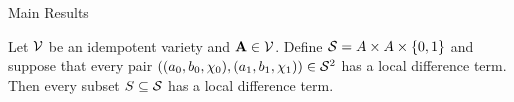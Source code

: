 \documentclass[12pt,xcolor=dvipsnames%
   ]{beamer}
\renewcommand{\cite}[1]{\relax}
\begin{document}
\begin{frame}{Main Results}

\begin{theorem} %
  \label{thm:local-diff-terms}
  Let $\mathcal{V}$ be an idempotent variety and
  $\mathbf{A} \in \mathcal{V}$. Define
  $\mathcal{S}= A \times A \times \{0,1\}$
  and suppose that every pair
  $((a_0, b_0, \chi_0), (a_1, b_1, \chi_1)) \in \mathcal{S}^2$
  has a local difference term.
  Then every subset $S \subseteq \mathcal{S}$
  has a local difference term.
\end{theorem}


\end{frame}
\end{document}
